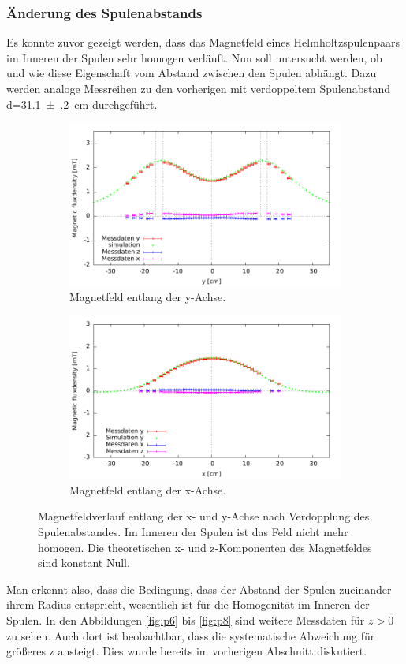 \documentclass[12pt,a4paper]{article}
\begin{document}
\subsubsection{Änderung des Spulenabstands}
Es konnte zuvor gezeigt werden, dass das Magnetfeld eines Helmholtzspulenpaars im Inneren der Spulen sehr homogen verläuft. Nun soll untersucht werden, ob und wie diese Eigenschaft vom Abstand zwischen den Spulen abhängt. Dazu werden analoge Messreihen zu den vorherigen mit verdoppeltem Spulenabstand d=\SI{31.1(2)}{cm} durchgeführt.
\begin{figure}[H]
	\centering
	\begin{subfigure}[c]{0.46\textwidth}
		\centering
		\includegraphics[scale=0.6]{plot_neuer_abstand_1.pdf}
		\caption{Magnetfeld entlang der y-Achse.}
	\end{subfigure}
\hspace{0.04\textwidth}
	\begin{subfigure}[c]{0.46\textwidth}
		\centering
		\includegraphics[scale=0.6]{plot_neuer_abstand_2.pdf}
		\caption{Magnetfeld entlang der x-Achse.}
	\end{subfigure}
	\caption{Magnetfeldverlauf entlang der x- und y-Achse nach Verdopplung des Spulenabstandes. Im Inneren der Spulen ist das Feld nicht mehr homogen. Die theoretischen x- und z-Komponenten des Magnetfeldes sind konstant Null.}
\end{figure}
Man erkennt also, dass die Bedingung, dass der Abstand der Spulen zueinander ihrem Radius entspricht, wesentlich ist für die Homogenität im Inneren der Spulen. In den Abbildungen \ref{fig:p6} bis \ref{fig:p8} sind weitere Messdaten für $z> 0$ zu sehen. Auch dort ist beobachtbar, dass die systematische Abweichung für größeres z ansteigt. Dies wurde bereits im vorherigen Abschnitt diskutiert.
\end{document}
